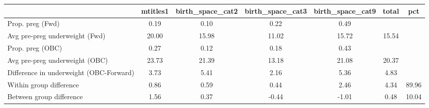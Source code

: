 \begin{tabular}{l*{6}{c}}
\toprule
            &\multicolumn{1}{c}{mtitles1}&\multicolumn{1}{c}{birth\_space\_cat2}&\multicolumn{1}{c}{birth\_space\_cat3}&\multicolumn{1}{c}{birth\_space\_cat9}&\multicolumn{1}{c}{total}&\multicolumn{1}{c}{pct}\\
\midrule
\midrule
Prop. preg (Fwd)&        0.19&        0.10&        0.22&        0.49&            &            \\
Avg pre-preg underweight (Fwd)&       20.00&       15.98&       11.02&       15.72&       15.54&            \\
Prop. preg (OBC)&        0.27&        0.12&        0.18&        0.43&            &            \\
Avg pre-preg underweight (OBC)&       23.73&       21.39&       13.18&       21.08&       20.37&            \\
Difference in underweight (OBC-Forward)&        3.73&        5.41&        2.16&        5.36&        4.83&            \\
Within group difference&        0.86&        0.59&        0.44&        2.46&        4.34&       89.96\\
Between group difference&        1.56&        0.37&       -0.44&       -1.01&        0.48&       10.04\\
\bottomrule
\end{tabular}
